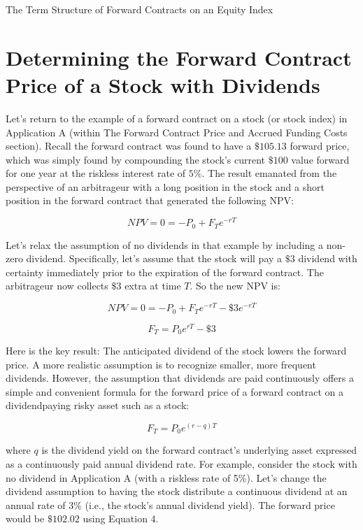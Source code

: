 \documentclass[11pt]{article}
\begin{document}
The Term Structure of Forward Contracts on an Equity Index

\section*{Determining the Forward Contract Price of a Stock with Dividends}
Let's return to the example of a forward contract on a stock (or stock index) in Application A (within The Forward Contract Price and Accrued Funding Costs section). Recall the forward contract was found to have a $\$ 105.13$ forward price, which was simply found by compounding the stock's current $\$ 100$ value forward for one year at the riskless interest rate of $5 \%$. The result emanated from the perspective of an arbitrageur with a long position in the stock and a short position in the forward contract that generated the following NPV:


\begin{equation*}
N P V=0=-P_{0}+F_{T} e^{-r T} \tag{3}
\end{equation*}


Let's relax the assumption of no dividends in that example by including a non-zero dividend. Specifically, let's assume that the stock will pay a $\$ 3$ dividend with certainty immediately prior to the expiration of the forward contract. The arbitrageur now collects $\$ 3$ extra at time $T$. So the new NPV is:

$$
N P V=0=-P_{0}+F_{T} e^{-r T}-\$ 3 e^{-r T}
$$

$$
F_{T}=P_{0} e^{r T}-\$ 3
$$

Here is the key result: The anticipated dividend of the stock lowers the forward price. A more realistic assumption is to recognize smaller, more frequent dividends. However, the assumption that dividends are paid continuously offers a simple and convenient formula for the forward price of a forward contract on a dividendpaying risky asset such as a stock:


\begin{equation*}
F_{T}=P_{0} e^{(r-q) T} \tag{4}
\end{equation*}


where $q$ is the dividend yield on the forward contract's underlying asset expressed as a continuously paid annual dividend rate. For example, consider the stock with no dividend in Application A (with a riskless rate of 5\%). Let's change the dividend assumption to having the stock distribute a continuous dividend at an annual rate of $3 \%$ (i.e., the stock's annual dividend yield). The forward price would be $\$ 102.02$ using Equation 4.
\end{document}
